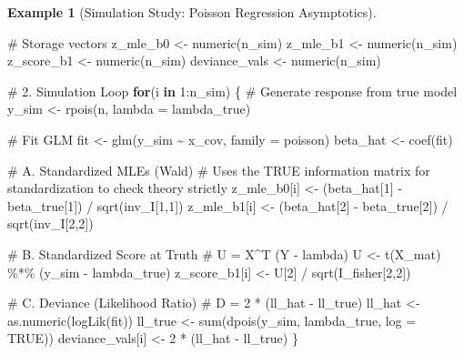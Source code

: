 \documentclass[
  letterpaper,
  DIV=11,
  numbers=noendperiod]{scrreprt}
\newenvironment{Shaded}{\begin{snugshade}}{\end{snugshade}}
\newcommand{\AttributeTok}[1]{\textcolor[rgb]{0.40,0.45,0.13}{#1}}
\newcommand{\CommentTok}[1]{\textcolor[rgb]{0.37,0.37,0.37}{#1}}
\newcommand{\ConstantTok}[1]{\textcolor[rgb]{0.56,0.35,0.01}{#1}}
\newcommand{\ControlFlowTok}[1]{\textcolor[rgb]{0.00,0.23,0.31}{\textbf{#1}}}
\newcommand{\DecValTok}[1]{\textcolor[rgb]{0.68,0.00,0.00}{#1}}
\newcommand{\FunctionTok}[1]{\textcolor[rgb]{0.28,0.35,0.67}{#1}}
\newcommand{\NormalTok}[1]{\textcolor[rgb]{0.00,0.23,0.31}{#1}}
\newcommand{\OtherTok}[1]{\textcolor[rgb]{0.00,0.23,0.31}{#1}}
\newcommand{\SpecialCharTok}[1]{\textcolor[rgb]{0.37,0.37,0.37}{#1}}
\renewcommand{\[}{\begin{equation}}
\renewcommand{\]}{\end{equation}}
\theoremstyle{definition}
\theoremstyle{plain}
\theoremstyle{plain}
\theoremstyle{plain}
\theoremstyle{definition}
\newtheorem{example}{Example}[chapter]
\theoremstyle{plain}
\theoremstyle{remark}
\begin{document}
\begin{example}[Simulation Study: Poisson Regression
Asymptotics]
\begin{Shaded}
\begin{Highlighting}[]
\CommentTok{\# Storage vectors}
\NormalTok{z\_mle\_b0 }\OtherTok{\textless{}{-}} \FunctionTok{numeric}\NormalTok{(n\_sim)}
\NormalTok{z\_mle\_b1 }\OtherTok{\textless{}{-}} \FunctionTok{numeric}\NormalTok{(n\_sim)}
\NormalTok{z\_score\_b1 }\OtherTok{\textless{}{-}} \FunctionTok{numeric}\NormalTok{(n\_sim)}
\NormalTok{deviance\_vals }\OtherTok{\textless{}{-}} \FunctionTok{numeric}\NormalTok{(n\_sim)}

\CommentTok{\# 2. Simulation Loop}
\ControlFlowTok{for}\NormalTok{(i }\ControlFlowTok{in} \DecValTok{1}\SpecialCharTok{:}\NormalTok{n\_sim) \{}
  \CommentTok{\# Generate response from true model}
\NormalTok{  y\_sim }\OtherTok{\textless{}{-}} \FunctionTok{rpois}\NormalTok{(n, }\AttributeTok{lambda =}\NormalTok{ lambda\_true)}
  
  \CommentTok{\# Fit GLM}
\NormalTok{  fit }\OtherTok{\textless{}{-}} \FunctionTok{glm}\NormalTok{(y\_sim }\SpecialCharTok{\textasciitilde{}}\NormalTok{ x\_cov, }\AttributeTok{family =}\NormalTok{ poisson)}
\NormalTok{  beta\_hat }\OtherTok{\textless{}{-}} \FunctionTok{coef}\NormalTok{(fit)}
  
  \CommentTok{\# A. Standardized MLEs (Wald)}
  \CommentTok{\# Uses the TRUE information matrix for standardization to check theory strictly}
\NormalTok{  z\_mle\_b0[i] }\OtherTok{\textless{}{-}}\NormalTok{ (beta\_hat[}\DecValTok{1}\NormalTok{] }\SpecialCharTok{{-}}\NormalTok{ beta\_true[}\DecValTok{1}\NormalTok{]) }\SpecialCharTok{/} \FunctionTok{sqrt}\NormalTok{(inv\_I[}\DecValTok{1}\NormalTok{,}\DecValTok{1}\NormalTok{])}
\NormalTok{  z\_mle\_b1[i] }\OtherTok{\textless{}{-}}\NormalTok{ (beta\_hat[}\DecValTok{2}\NormalTok{] }\SpecialCharTok{{-}}\NormalTok{ beta\_true[}\DecValTok{2}\NormalTok{]) }\SpecialCharTok{/} \FunctionTok{sqrt}\NormalTok{(inv\_I[}\DecValTok{2}\NormalTok{,}\DecValTok{2}\NormalTok{])}
  
  \CommentTok{\# B. Standardized Score at Truth}
  \CommentTok{\# U = X\^{}T (Y {-} lambda)}
\NormalTok{  U }\OtherTok{\textless{}{-}} \FunctionTok{t}\NormalTok{(X\_mat) }\SpecialCharTok{\%*\%}\NormalTok{ (y\_sim }\SpecialCharTok{{-}}\NormalTok{ lambda\_true)}
\NormalTok{  z\_score\_b1[i] }\OtherTok{\textless{}{-}}\NormalTok{ U[}\DecValTok{2}\NormalTok{] }\SpecialCharTok{/} \FunctionTok{sqrt}\NormalTok{(I\_fisher[}\DecValTok{2}\NormalTok{,}\DecValTok{2}\NormalTok{])}
  
  \CommentTok{\# C. Deviance (Likelihood Ratio)}
  \CommentTok{\# D = 2 * (ll\_hat {-} ll\_true)}
\NormalTok{  ll\_hat }\OtherTok{\textless{}{-}} \FunctionTok{as.numeric}\NormalTok{(}\FunctionTok{logLik}\NormalTok{(fit))}
\NormalTok{  ll\_true }\OtherTok{\textless{}{-}} \FunctionTok{sum}\NormalTok{(}\FunctionTok{dpois}\NormalTok{(y\_sim, lambda\_true, }\AttributeTok{log =} \ConstantTok{TRUE}\NormalTok{))}
\NormalTok{  deviance\_vals[i] }\OtherTok{\textless{}{-}} \DecValTok{2} \SpecialCharTok{*}\NormalTok{ (ll\_hat }\SpecialCharTok{{-}}\NormalTok{ ll\_true)}
\NormalTok{\}}


\end{Highlighting}
\end{Shaded}
\end{example}
\end{document}
